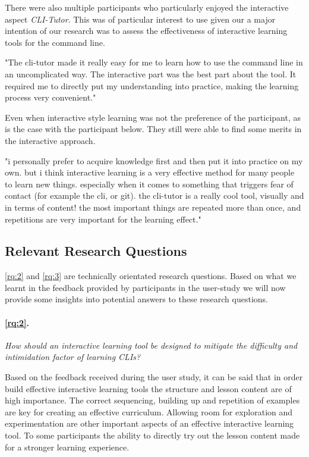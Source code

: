 There were also multiple participants who particularly enjoyed the interactive
aspect \textit{CLI-Tutor}. This was of particular interest to use given our a
major intention of our research was to assess the effectiveness of interactive
learning tools for the command line.

\begin{quotes}
	"The cli-tutor made it really easy for me to learn how to use the command line
	in an uncomplicated way. The interactive part was the best part about the tool.
	It required me to directly put my understanding into practice, making the
	learning process very convenient."
\end{quotes}

Even when interactive style learning was not the preference of the participant,
as is the case with the participant below. They still were able to find some
merits in the interactive approach.

\begin{quotes}
	"i personally prefer to acquire knowledge first and then put it into practice on my own. but i
	think interactive learning is a very effective method for many people to learn new things.
	especially when it comes to something that triggers fear of contact (for example the cli, or git).
	the cli-tutor is a really cool tool, visually and in terms of content! the most important things are
	repeated more than once, and repetitions are very important for the learning effect."
\end{quotes}

\subsection{Relevant Research Questions}

\ref{rq:2} and \ref{rq:3} are technically orientated research questions. Based
on what we learnt in the feedback provided by participants in the user-study we
will now provide some insights into potential answers to these research questions.


\paragraph{\ref{rq:2}.} \textit{How should an interactive learning tool be designed to mitigate
the difficulty and intimidation factor of learning CLIs?}

Based on the feedback received during the user study, it can be said that in
order build effective interactive learning tools the structure and lesson
content are of high importance. The correct sequencing, building up and
repetition of examples are key for creating an effective curriculum. Allowing
room for exploration and experimentation are other important aspects of an
effective interactive learning tool. To some participants the ability to
directly try out the lesson content made for a stronger learning experience.



